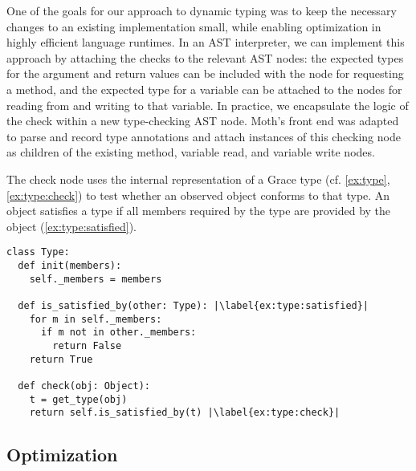 
One of the goals for our approach to dynamic typing was to keep
the necessary changes to an existing implementation small,
while enabling optimization in highly efficient language runtimes.
%
In an AST interpreter, we can implement this approach by attaching the
checks to the relevant AST nodes: the expected types for the argument
and return values can be included with the node for requesting a
method, and the expected type for a variable can be attached to the
nodes for reading from and writing to that variable.  In practice, we
encapsulate the logic of the check within a new type-checking AST
node.  Moth's front end was adapted to parse and record type
annotations and attach instances of this checking node as children of the
existing method, variable read, and variable write nodes.



%

The check node uses the internal representation of a Grace type
(cf. \cref{ex:type}, \cref{ex:type:check}) to test whether an observed
object conforms to that type. 
An object satisfies a type if all members required by the type are provided
by the object (\cref{ex:type:satisfied}).


\begin{lstlisting}[label={ex:type},escapechar=|,caption={Sketch of a \code{Type} in our system and its \code{check()} semantics.},float,floatplacement=htb,columns=flexible]
class Type:
  def init(members):
    self._members = members

  def is_satisfied_by(other: Type): |\label{ex:type:satisfied}|
    for m in self._members:
      if m not in other._members:
        return False
    return True

  def check(obj: Object):
    t = get_type(obj)
    return self.is_satisfied_by(t) |\label{ex:type:check}|
\end{lstlisting}


\subsection{Optimization}
\label{ssec:optimization}


